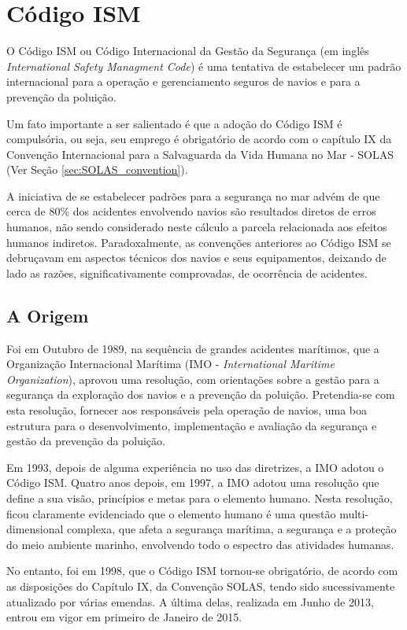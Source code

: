 \documentclass[../main.tex]{subfiles}
\begin{document}
\section{Código ISM} \label{sec:ISM-code}
 O Código ISM ou Código Internacional da Gestão da Segurança (em inglês \emph{International Safety Managment Code}) é uma tentativa de estabelecer um padrão internacional para a operação e gerenciamento seguros de navios e para a prevenção da poluição.
 
 Um fato importante a ser salientado é que a adoção do Código ISM é compulsória, ou seja, seu emprego é obrigatório de acordo com o capítulo IX da Convenção Internacional para a Salvaguarda da Vida Humana no Mar - SOLAS (Ver Seção \ref{sec:SOLAS_convention}).
 
 A iniciativa de se estabelecer padrões para a segurança no mar advém de que cerca de 80\% dos acidentes envolvendo navios são resultados diretos de erros humanos, não sendo considerado neste cálculo a parcela relacionada aos efeitos humanos indiretos. Paradoxalmente, as convenções anteriores ao Código ISM se debruçavam em aspectos técnicos dos navios e seus equipamentos, deixando de lado as razões, significativamente comprovadas, de ocorrência de acidentes.
 
 \subsection{A Origem}
  Foi em Outubro de 1989, na sequência de grandes acidentes marítimos, que a Organização Internacional Marítima (IMO - \emph{International Maritime Organization}), aprovou uma resolução, com orientações sobre a gestão para a segurança da exploração dos navios e a prevenção da poluição. Pretendia-se com esta resolução, fornecer aos responsáveis pela operação de navios, uma boa estrutura para o desenvolvimento, implementação e avaliação da segurança e gestão da prevenção da poluição.
  
  Em 1993, depois de alguma experiência no uso das diretrizes, a IMO adotou o Código ISM. Quatro anos depois, em 1997, a IMO adotou uma resolução que define a sua visão, princípios e metas para o elemento humano. Nesta resolução, ficou claramente evidenciado que o elemento humano é uma questão multi-dimensional complexa, que afeta a segurança marítima, a segurança e a proteção do meio ambiente marinho,
envolvendo todo o espectro das atividades humanas.

  No entanto, foi em 1998, que o Código ISM tornou-se obrigatório, de acordo com as disposições do
Capítulo IX, da Convenção SOLAS, tendo sido sucessivamente atualizado por várias emendas. A última delas, realizada em Junho de 2013, entrou em vigor em primeiro de Janeiro de 2015.  
  
\end{document}
